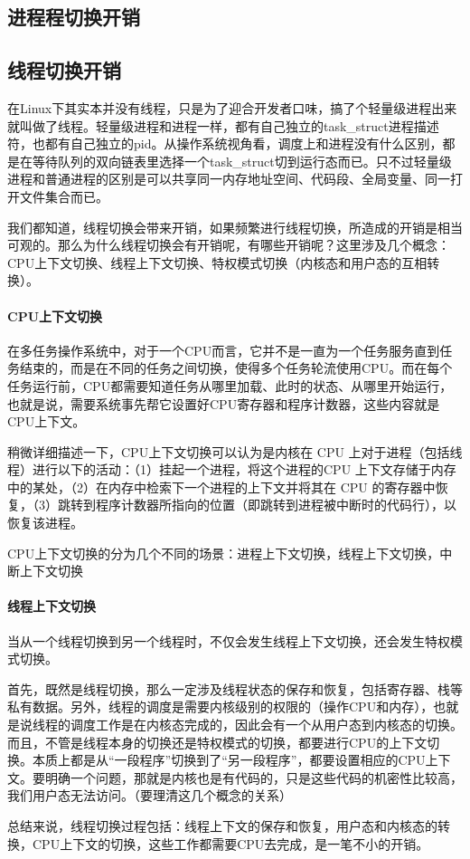 \documentclass[../../../interview-questions.tex]{subfiles}
\begin{document}
\subsection{进程程切换开销}


\subsection{线程切换开销}

在Linux下其实本并没有线程，只是为了迎合开发者口味，搞了个轻量级进程出来就叫做了线程。轻量级进程和进程一样，都有自己独立的task\_struct进程描述符，也都有自己独立的pid。从操作系统视角看，调度上和进程没有什么区别，都是在等待队列的双向链表里选择一个task\_struct切到运行态而已。只不过轻量级进程和普通进程的区别是可以共享同一内存地址空间、代码段、全局变量、同一打开文件集合而已。

我们都知道，线程切换会带来开销，如果频繁进行线程切换，所造成的开销是相当可观的。那么为什么线程切换会有开销呢，有哪些开销呢？这里涉及几个概念：CPU上下文切换、线程上下文切换、特权模式切换（内核态和用户态的互相转换）。

\paragraph{CPU上下文切换}

在多任务操作系统中，对于一个CPU而言，它并不是一直为一个任务服务直到任务结束的，而是在不同的任务之间切换，使得多个任务轮流使用CPU。而在每个任务运行前，CPU都需要知道任务从哪里加载、此时的状态、从哪里开始运行，也就是说，需要系统事先帮它设置好CPU寄存器和程序计数器，这些内容就是CPU上下文。

稍微详细描述一下，CPU上下文切换可以认为是内核在 CPU 上对于进程（包括线程）进行以下的活动：（1）挂起一个进程，将这个进程的CPU 上下文存储于内存中的某处，（2）在内存中检索下一个进程的上下文并将其在 CPU 的寄存器中恢复，（3）跳转到程序计数器所指向的位置（即跳转到进程被中断时的代码行），以恢复该进程。

CPU上下文切换的分为几个不同的场景：进程上下文切换，线程上下文切换，中断上下文切换

\paragraph{线程上下文切换}

当从一个线程切换到另一个线程时，不仅会发生线程上下文切换，还会发生特权模式切换。

首先，既然是线程切换，那么一定涉及线程状态的保存和恢复，包括寄存器、栈等私有数据。另外，线程的调度是需要内核级别的权限的（操作CPU和内存），也就是说线程的调度工作是在内核态完成的，因此会有一个从用户态到内核态的切换。而且，不管是线程本身的切换还是特权模式的切换，都要进行CPU的上下文切换。本质上都是从“一段程序”切换到了“另一段程序”，都要设置相应的CPU上下文。要明确一个问题，那就是内核也是有代码的，只是这些代码的机密性比较高，我们用户态无法访问。（要理清这几个概念的关系）

总结来说，线程切换过程包括：线程上下文的保存和恢复，用户态和内核态的转换，CPU上下文的切换，这些工作都需要CPU去完成，是一笔不小的开销。
\end{document}
